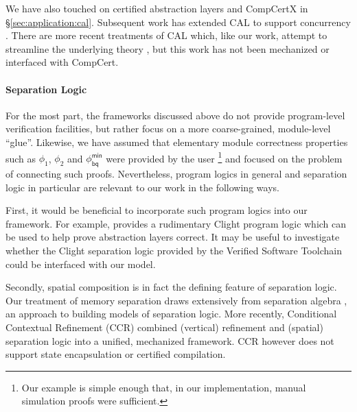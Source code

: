 \documentclass[acmsmall,nonacm]{acmart}
\newcommand{\kw}[1]{\ensuremath{ \mathsf{#1} }}
\begin{document}
We have also touched on
certified abstraction layers and CompCertX in \S\ref{sec:application:cal}.
Subsequent work has extended CAL to support concurrency \cite{ccal}.
There are more recent treatments of CAL which,
like our work,
attempt to streamline the underlying theory
\citep{popl22,rbgs-cal},
but this work has not been mechanized
or interfaced with CompCert.



\paragraph{Separation Logic} %

For the most part,
the frameworks discussed above
do not provide program-level verification facilities,
but rather focus on a more coarse-grained, module-level ``glue''.
Likewise,
we have assumed that elementary module correctness properties
such as $\phi_1$, $\phi_2$ and $\phi_\kw{bq}^\kw{min}$
were provided by the user%
\footnote{Our example is simple enough that,
  in our implementation,
  manual simulation proofs were
  sufficient.}
and focused on the problem of
connecting such proofs.
Nevertheless,
program logics in general and separation logic in particular
are relevant to our work in the following ways.

First, it would be beneficial to incorporate
such program logics into our framework.
For example, \citet{popl15} provides
a rudimentary Clight program logic which
can be used to help prove abstraction layers correct. 
It may be useful to investigate whether
the Clight separation logic provided by
the Verified Software Toolchain \cite{vst}
could be interfaced with our model.

Secondly,
spatial composition is in fact
the defining feature of separation logic.
Our treatment of memory separation
draws extensively from
separation algebra \cite{sepalg},
an approach to building models of separation logic.
More recently,
Conditional Contextual Refinement (CCR) \cite{ccr}
combined (vertical) refinement and (spatial) separation logic into
a unified, mechanized framework.
CCR however does not support state encapsulation
or certified compilation.
\end{document}
